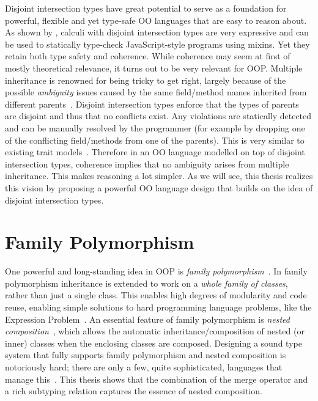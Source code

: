 Disjoint intersection types have great potential to serve as a foundation for
powerful, flexible and yet type-safe OO languages that are easy to reason about.
As shown by \citet{alpuimdisjoint}, calculi with disjoint intersection types are
very expressive and can be used to statically type-check JavaScript-style
programs using mixins. Yet they retain both type safety and coherence. While
coherence may seem at first of mostly theoretical relevance, it turns out to be
very relevant for OOP. Multiple inheritance is renowned for being tricky to get
right, largely because of the possible \emph{ambiguity} issues caused by the
same field/method names inherited from different parents~\citep{bracha1990mixin,
  scharli2003traits}. Disjoint intersection types enforce that the types of
parents are disjoint and thus that no conflicts exist. Any violations are
statically detected and can be manually resolved by the programmer (for example
by dropping one of the conflicting field/methods from one of the parents). This
is very similar to existing trait models~\citep{scharli2003traits,
  Ducasse_2006}. Therefore in an OO language modelled on top of disjoint
intersection types, coherence implies that no ambiguity arises from multiple
inheritance. This makes reasoning a lot simpler. As we will see, this thesis
realizes this vision by proposing a powerful OO language design that builds on
the idea of disjoint intersection types.

\section{Family Polymorphism}

One powerful and long-standing idea in OOP is \emph{family
  polymorphism}~\citep{Ernst_2001}. In family polymorphism inheritance is
extended to work on a \emph{whole family of classes}, rather than just a single
class. This enables high degrees of modularity and code reuse, enabling simple
solutions to hard programming language problems, like the Expression
Problem~\citep{wadler1998expression}. An essential feature of family
polymorphism is \emph{nested composition}~\citep{Corradi_2012, ErnstVirtual,
  Nystrom_2004}, which allows the automatic inheritance/composition of nested
(or inner) classes when the enclosing classes are composed. Designing a sound
type system that fully supports family polymorphism and nested composition is
notoriously hard; there are only a few, quite sophisticated, languages that
manage this~\citep{ErnstVirtual, Nystrom_2004, pubsdoc:tribe-virtual-calculus,
  SAITO_2007}. This thesis shows that the combination of the merge operator and
a rich subtyping relation captures the essence of nested composition.

